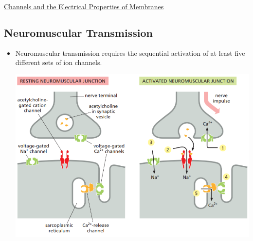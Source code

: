 \documentclass[12pt,letterpaper]{article}
\begin{document}
\begin{secbox}{\hyperlink{11}{Channels and the Electrical Properties of Membranes}}
{    \hypertarget{11.3.16}{\subsection*{Neuromuscular Transmission}}
    \begin{itemize}
        \item Neuromuscular transmission requires the sequential activation of at least five different sets of ion channels.
        \begin{center}
            \includegraphics[scale=0.5]{images/fig11-39.png}
        \end{center}
    \end{itemize}
    \vspace{-1cm}

}
\end{secbox}
\end{document}
